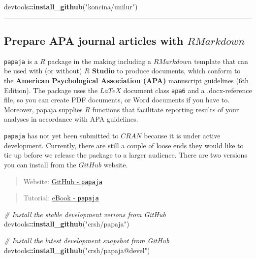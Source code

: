 \documentclass[]{book}
\newenvironment{Shaded}{\begin{snugshade}}{\end{snugshade}}
\newcommand{\KeywordTok}[1]{\textcolor[rgb]{0.13,0.29,0.53}{\textbf{#1}}}
\newcommand{\StringTok}[1]{\textcolor[rgb]{0.31,0.60,0.02}{#1}}
\newcommand{\CommentTok}[1]{\textcolor[rgb]{0.56,0.35,0.01}{\textit{#1}}}
\newcommand{\OperatorTok}[1]{\textcolor[rgb]{0.81,0.36,0.00}{\textbf{#1}}}
\newcommand{\NormalTok}[1]{#1}
\theoremstyle{definition}
\theoremstyle{definition}
\theoremstyle{definition}
\theoremstyle{remark}
\begin{document}
\begin{Shaded}
\begin{Highlighting}[]
\NormalTok{devtools}\OperatorTok{::}\KeywordTok{install_github}\NormalTok{(}\StringTok{"koncina/unilur"}\NormalTok{)}
\end{Highlighting}
\end{Shaded}

\begin{center}\rule{0.5\linewidth}{\linethickness}\end{center}

\subsection{\texorpdfstring{Prepare APA journal articles with
\(R Markdown\)}{Prepare APA journal articles with R Markdown}}\label{prepare-apa-journal-articles-with-r-markdown}

\texttt{papaja} is a \(R\) package in the making including a
\(R Markdown\) template that can be used with (or without) \textbf{\(R\)
Studio} to produce documents, which conform to the \textbf{American
Psychological Association (APA)} manuscript guidelines (6th Edition).
The package uses the \(LaTeX\) document class \texttt{apa6} and a
.docx-reference file, so you can create PDF documents, or Word documents
if you have to. Moreover, papaja supplies \(R\) functions that
facilitate reporting results of your analyses in accordance with APA
guidelines.

\texttt{papaja} has not yet been submitted to \(CRAN\) because it is
under active development. Currently, there are still a couple of loose
ends they would like to tie up before we release the package to a larger
audience. There are two versions you can install from the \(GitHub\)
website.

\begin{quote}
Website: \href{https://github.com/crsh/papaja}{GitHub - \texttt{papaja}}
\end{quote}

\begin{quote}
Tutorial: \href{https://crsh.github.io/papaja_man/}{eBook -
\texttt{papaja}}
\end{quote}

\begin{Shaded}
\begin{Highlighting}[]
\CommentTok{# Install the stable development verions from GitHub}
\NormalTok{devtools}\OperatorTok{::}\KeywordTok{install_github}\NormalTok{(}\StringTok{"crsh/papaja"}\NormalTok{)}

\CommentTok{# Install the latest development snapshot from GitHub}
\NormalTok{devtools}\OperatorTok{::}\KeywordTok{install_github}\NormalTok{(}\StringTok{"crsh/papaja@devel"}\NormalTok{)}
\end{Highlighting}
\end{Shaded}
\end{document}
